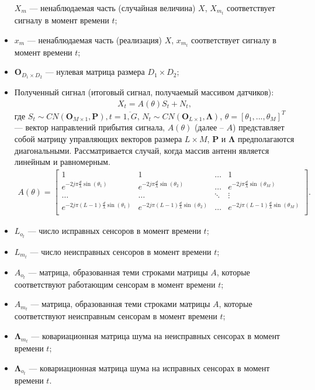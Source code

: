 \documentclass[11pt]{article}
\begin{document}
\begin{itemize}
$X_m$ --- ненаблюдаемая часть (случайная величина) $X$, $X_{m_t}$ соответствует сигналу в момент времени $t$;
\item
$x_m$ --- ненаблюдаемая часть (реализация) $X$, $x_{m_t}$ соответствует сигналу в момент времени $t$;
\item
$\mathbf{O}_{D_1 \times D_2}$ --- нулевая матрица размера $D_1 \times D_2$;
\item
Полученный сигнал (итоговый сигнал, получаемый массивом датчиков):
\begin{equation}
\begin{gathered}
X_t=A(\theta)S_t+N_t,
\end{gathered}
\end{equation}
где $S_t \sim CN(\mathbf{O}_{M \times 1},\mathbf{P}),t=\overline{1,G}$, $N_t \sim CN(\mathbf{O}_{L \times 1}, \mathbf{\Lambda})$,  $\theta=[\theta_1,...,\theta_M]^T$ --- вектор направлений прибытия сигнала, $A(\theta)$ (далее -- $A$) представляет собой матрицу управляющих векторов размера $L \times M$, $\mathbf{P}$ и $\mathbf{\Lambda}$ предполагаются диагональными. Рассматривается случай, когда массив антенн является линейным и равномерным.
\begin{gather}
A(\theta) = \begin{bmatrix}
1&1&\dots&1\\
e^{-2j\pi \frac{d}{\lambda}\sin(\theta_1)}& e^{-2j\pi \frac{d}{\lambda}\sin(\theta_2)}&\dots&e^{-2j\pi \frac{d}{\lambda}\sin(\theta_M)}\\
\dots&\dots&\ddots&\vdots\\
e^{-2j\pi (L-1) \frac{d}{\lambda}\sin(\theta_1)}& e^{-2j\pi (L-1) \frac{d}{\lambda}\sin(\theta_2)}&\dots&e^{-2j\pi (L-1) \frac{d}{\lambda}\sin(\theta_M)}\\
\end{bmatrix}.
\nonumber
\end{gather}
\end{itemize}
\begin{itemize}
\item
$L_{o_t}$ --- число исправных сенсоров в момент времени $t$;
\item
 $L_{m_t}$ --- число неисправных сенсоров в момент времени $t$;
\item 
$A_{o_t}$ --- матрица, образованная теми строками матрицы $A$, которые соответствуют работающим сенсорам в момент времени $t$; 
\item
$A_{m_t}$ --- матрица, образованная теми строками матрицы $A$, которые соответствуют неисправным сенсорам в момент времени $t$;
\item
$\mathbf{\Lambda}_{m_t}$ --- ковариационная матрица шума на неисправных сенсорах в момент времени $t$;
\item 
 $\mathbf{\Lambda}_{o_t}$ --- ковариационная матрица шума на исправных сенсорах в момент времени $t$.
\end{itemize}
\end{document}
